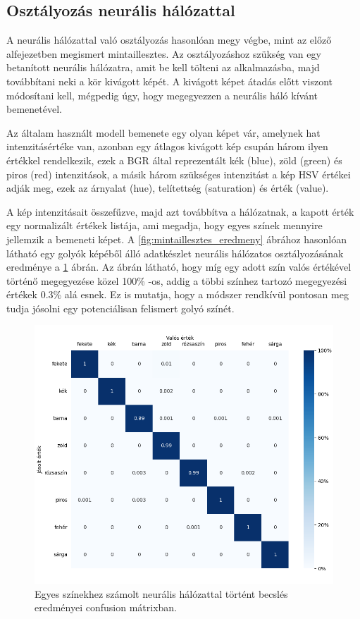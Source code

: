 \subsection{Osztályozás neurális hálózattal}
A neurális hálózattal való osztályozás hasonlóan megy végbe, mint az előző alfejezetben megismert mintaillesztes. Az osztályozáshoz szükség van egy betanított neurális hálózatra, amit be kell tölteni az alkalmazásba, majd továbbítani neki a kör kivágott képét. A kivágott képet átadás előtt viszont módosítani kell, mégpedig úgy, hogy megegyezzen a neurális háló kívánt bemenetével.
\par Az általam használt modell bemenete egy olyan képet vár, amelynek hat intenzitásértéke van, azonban egy átlagos kivágott kép csupán három ilyen értékkel rendelkezik, ezek a BGR által reprezentált kék (blue), zöld (green) és piros (red) intenzitások, a másik három szükséges intenzitást a kép HSV értékei adják meg, ezek az árnyalat (hue), telítettség (saturation) és érték (value).
\par A kép intenzitásait összefűzve, majd azt továbbítva a hálózatnak, a kapott érték egy normalizált értékek listája, ami megadja, hogy egyes színek mennyire jellemzik a bemeneti képet. A \ref{fig:mintaillesztes_eredmeny} ábrához hasonlóan látható egy golyók képéből álló adatkészlet neurális hálózatos osztályozásának eredménye a \ref{fig:neuralis_osztalyozas_eredmeny} ábrán. Az ábrán látható, hogy míg egy adott szín valós értékével történő megegyezése közel 100\% -os, addig a többi színhez tartozó megegyezési értékek 0.3\% alá esnek. Ez is mutatja, hogy a módszer rendkívül pontosan meg tudja jósolni egy potenciálisan felismert golyó színét.

\begin{figure}[!ht]
    \centering
    \includegraphics[width=150mm, keepaspectratio]{figures/confusion_matrix_nn.png}
    \caption{Egyes színekhez számolt neurális hálózattal történt becslés eredményei confusion mátrixban.}
    \label{fig:neuralis_osztalyozas_eredmeny}
\end{figure}

